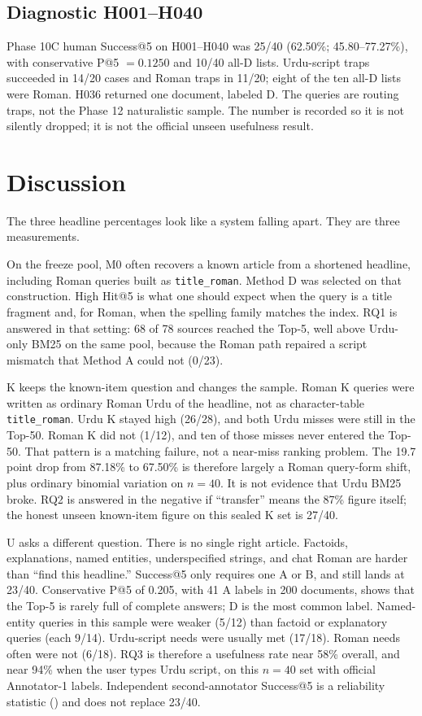 \documentclass[10pt,letterpaper]{article}
\begin{document}
\subsection*{Diagnostic H001--H040}

Phase 10C human Success@5 on H001--H040 was 25/40 (62.50\%; 45.80--77.27\%), with conservative P@5 $= 0.1250$ and 10/40 all-D lists. Urdu-script traps succeeded in 14/20 cases and Roman traps in 11/20; eight of the ten all-D lists were Roman. H036 returned one document, labeled D. The queries are routing traps, not the Phase 12 naturalistic sample. The number is recorded so it is not silently dropped; it is not the official unseen usefulness result.

\section*{Discussion}
The three headline percentages look like a system falling apart. They are three measurements.

On the freeze pool, M0 often recovers a known article from a shortened headline, including Roman queries built as \texttt{title\_roman}. Method D was selected on that construction. High Hit@5 is what one should expect when the query is a title fragment and, for Roman, when the spelling family matches the index. RQ1 is answered in that setting: 68 of 78 sources reached the Top-5, well above Urdu-only BM25 on the same pool, because the Roman path repaired a script mismatch that Method A could not (0/23).

K keeps the known-item question and changes the sample. Roman K queries were written as ordinary Roman Urdu of the headline, not as character-table \texttt{title\_roman}. Urdu K stayed high (26/28), and both Urdu misses were still in the Top-50. Roman K did not (1/12), and ten of those misses never entered the Top-50. That pattern is a matching failure, not a near-miss ranking problem. The 19.7 point drop from 87.18\% to 67.50\% is therefore largely a Roman query-form shift, plus ordinary binomial variation on $n = 40$. It is not evidence that Urdu BM25 broke. RQ2 is answered in the negative if ``transfer'' means the 87\% figure itself; the honest unseen known-item figure on this sealed K set is 27/40.

U asks a different question. There is no single right article. Factoids, explanations, named entities, underspecified strings, and chat Roman are harder than ``find this headline.'' Success@5 only requires one A or B, and still lands at 23/40. Conservative P@5 of 0.205, with 41 A labels in 200 documents, shows that the Top-5 is rarely full of complete answers; D is the most common label. Named-entity queries in this sample were weaker (5/12) than factoid or explanatory queries (each 9/14). Urdu-script needs were usually met (17/18). Roman needs often were not (6/18). RQ3 is therefore a usefulness rate near 58\% overall, and near 94\% when the user types Urdu script, on this $n = 40$ set with official Annotator-1 labels. Independent second-annotator Success@5 is a reliability statistic () and does not replace 23/40.
\end{document}
